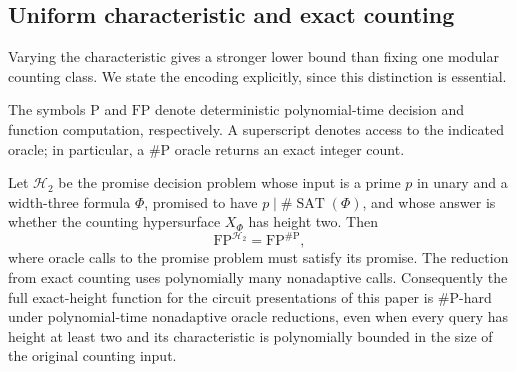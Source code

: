 \subsection{Uniform characteristic and exact counting}
Varying the characteristic gives a stronger lower bound than fixing one modular counting class. We state the encoding explicitly, since this distinction is essential.

The symbols $\mathrm P$ and $\mathrm{FP}$ denote deterministic
polynomial-time decision and function computation, respectively.
A superscript denotes access to the indicated oracle; in particular,
a $\#\mathrm P$ oracle returns an exact integer count.

\begin{theorem}\label{thm:uniform-counting}
Let $\mathcal H_2$ be the promise decision problem whose input is a prime $p$ in unary and a width-three formula $\Phi$, promised to have $p\mid\#\operatorname{SAT}(\Phi)$, and whose answer is whether the counting hypersurface $X_\Phi$ has height two. Then
\[
 \mathrm{FP}^{\mathcal H_2}=\mathrm{FP}^{\#\mathrm P},
\]
where oracle calls to the promise problem must satisfy its promise.
The reduction from exact counting uses polynomially many nonadaptive calls. Consequently the full exact-height function for the circuit presentations of this paper is $\#\mathrm P$-hard under polynomial-time nonadaptive oracle reductions, even when every query has height at least two and its characteristic is polynomially bounded in the size of the original counting input.
\end{theorem}
